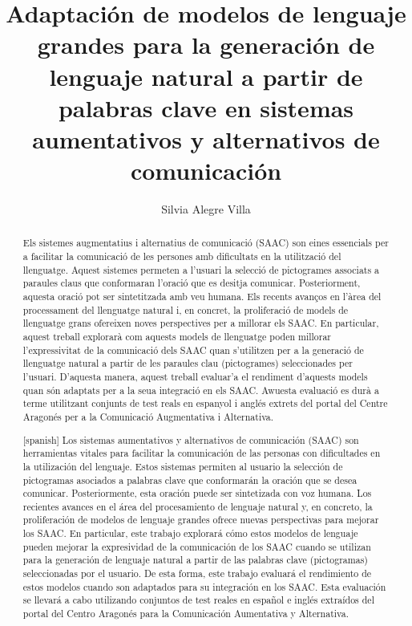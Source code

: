 \documentclass[11pt,spanish,listoffigures,listoftables]{tfgetsinf}
\title{Adaptación de modelos de lenguaje grandes para la generación
de lenguaje natural a partir de palabras clave en sistemas
aumentativos y alternativos de comunicación}
\author{Silvia Alegre Villa}
\begin{document}

\begin{abstract}
Els sistemes augmentatius i alternatius de comunicació (SAAC) son eines essencials per a facilitar la comunicació de les persones amb dificultats en la utilització del llenguatge. Aquest sistemes permeten a l'usuari la selecció de pictogrames associats a paraules claus que conformaran l'oració que es desitja comunicar. Posteriorment, aquesta oració pot ser sintetitzada amb veu humana. Els recents avanços en l'àrea del processament del llenguatge natural i, en concret, la proliferació de models de llenguatge grans ofereixen noves perspectives per a millorar els SAAC. En particular, aquest treball explorarà com aquests models de llenguatge poden millorar l'expressivitat de la comunicació dels SAAC quan s'utilitzen per a la generació de llenguatge natural a partir de les paraules clau (pictogrames) seleccionades per l'usuari. D'aquesta manera, aquest treball evaluar'a el rendiment d'aquests models quan són adaptats per a la seua integració en els SAAC. Awuesta evaluació es durà a terme utilitzant conjunts de test reals en espanyol i anglés extrets del portal del Centre Aragonés per a la Comunicació Augmentativa i Alternativa.
\end{abstract}
\begin{abstract}[spanish]
 Los sistemas aumentativos y alternativos de comunicación (SAAC) son herramientas vitales para facilitar la comunicación de las personas con dificultades en la utilización del lenguaje. Estos sistemas permiten al usuario la selección de pictogramas asociados a palabras clave que conformarán la oración que se desea comunicar. Posteriormente, esta oración puede ser sintetizada con voz humana. Los recientes avances en el área del procesamiento de lenguaje natural y, en concreto, la proliferación de modelos de lenguaje grandes ofrece nuevas perspectivas para mejorar los SAAC. En particular, este trabajo explorará cómo estos modelos de lenguaje pueden mejorar la expresividad de la comunicación de los SAAC cuando se utilizan para la generación de lenguaje natural a partir de las palabras clave (pictogramas) seleccionadas por el usuario. De esta forma, este trabajo evaluará el rendimiento de estos modelos cuando son adaptados para su integración en los SAAC. Esta evaluación se llevará a cabo utilizando conjuntos de test reales en español e inglés extraídos del portal del Centro Aragonés para la Comunicación Aumentativa y Alternativa.
\end{abstract}
\end{document}
